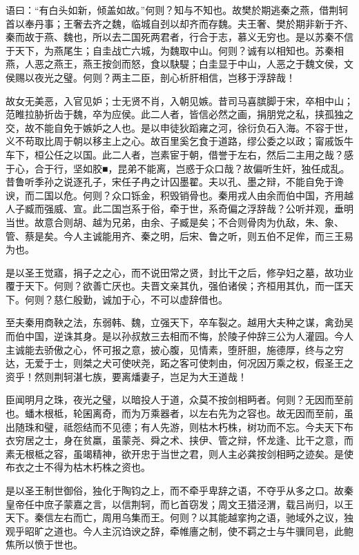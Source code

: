\documentclass[]{article}
\begin{document}
语曰：``有白头如新，倾盖如故。''何则？知与不知也。故樊於期逃秦之燕，借荆轲首以奉丹事；王奢去齐之魏，临城自刭以却齐而存魏。夫王奢、樊於期非新于齐、秦而故于燕、魏也，所以去二国死两君者，行合于志，慕义无穷也。是以苏秦不信于天下，为燕尾生；自圭战亡六城，为魏取中山。何则？诚有以相知也。苏秦相燕，人恶之燕王，燕王按剑而怒，食以駃騠；白圭显于中山，人恶之于魏文侯，文侯赐以夜光之璧。何则？两主二臣，剖心析肝相信，岂移于浮辞哉！

故女无美恶，入官见妒；士无贤不肖，入朝见嫉。昔司马喜膑脚于宋，卒相中山；范睢拉胁折齿于魏，卒为应侯。此二人者，皆信必然之画，捐朋党之私，挟孤独之交，故不能自免于嫉妒之人也。是以申徒狄蹈雍之河，徐衍负石入海。不容于世，义不苟取比周于朝以移主上之心。故百里奚乞食于道路，缪公委之以政；甯戚饭牛车下，桓公任之以国。此二人者，岂素宦于朝，借誉于左右，然后二主用之哉？感于心，合于行，坚如胶■，昆弟不能离，岂惑于众口哉？故偏听生奸，独任成乱。昔鲁听季孙之说逐孔子，宋任子冉之计囚墨翟。夫以孔、墨之辩，不能自免于谗谀，而二国以危。何则？众口铄金，积毁销骨也。秦用戎人由余而伯中国，齐用越人子臧而强威、宣。此二国岂系于俗，牵于世，系奇偏之浮辞哉？公听并观，垂明当世。故意合则胡、越为兄弟，由余、子臧是矣；不合则骨肉为仇敌，朱、象、管、蔡是矣。今人主诚能用齐、秦之明，后宋、鲁之听，则五伯不足侔，而三王易为也。

是以圣王觉寤，捐子之之心，而不说田常之贤，封比干之后，修孕妇之墓，故功业覆于天下。何则？欲善亡厌也。夫晋文亲其仇，强伯诸侯；齐桓用其仇，而一匡天下。何则？慈仁殷勤，诚加于心，不可以虚辞借也。

至夫秦用商鞅之法，东弱韩、魏，立强天下，卒车裂之。越用大夫种之谋，禽劲吴而伯中国，逆诛其身。是以孙叔敖三去相而不悔，於陵子仲辞三公为人灌园。今人主诚能去骄傲之心，怀可报之意，披心腹，见情素，堕肝胆，施德厚，终与之穷达，无爱于士，则桀之犬可使吠尧，跖之客可使刺由，何况因万乘之权，假圣王之资乎！然则荆轲湛七族，要离燔妻子，岂足为大王道哉！

臣闻明月之珠，夜光之璧，以暗投人于道，众莫不按剑相眄者。何则？无因而至前也。蟠木根柢，轮囷离奇，而为万乘器者，以左右先为之容也。故无因而至前，虽出随珠和璧，祗怨结而不见德；有人先游，则枯木朽株，树功而不忘。今夫天下布衣穷居之士，身在贫羸，虽蒙尧、舜之术、挟伊、管之辩，怀龙逢、比干之意，而素无根柢之容，虽竭精神，欲开忠于当世之君，则人主必龚按剑相眄之迹矣。是使布衣之士不得为枯木朽株之资也。

是以圣王制世御俗，独化于陶钧之上，而不牵乎卑辞之语，不夺乎从多之口。故秦皇帝任中庶子蒙嘉之言，以信荆轲，而匕首窃发；周文王猎泾渭，载吕尚归，以王天下。秦信左右而亡，周用乌集而王。何则？以其能越挛拘之语，驰域外之议，独观乎昭旷之道也。今人主沉诌谀之辞，牵帷廧之制，使不羁之士与牛骥同皂，此鲍焦所以愤于世也。
\end{document}
